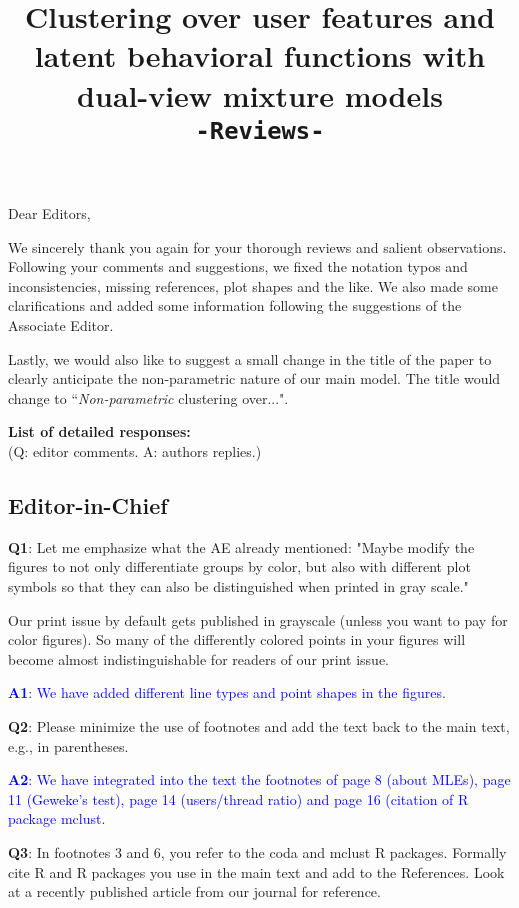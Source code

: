 \documentclass[]{article}
\title{Clustering over user features and latent behavioral functions with dual-view mixture models \\ \texttt{-Reviews-}}
\author{}
\begin{document}
	\date{}
	\maketitle
	
	Dear Editors,
	
	We sincerely thank you again for your thorough reviews and salient observations. Following your comments and suggestions, we fixed the notation typos and inconsistencies, missing references, plot shapes and the like. We also made some clarifications and added some information following the suggestions of the Associate Editor.
	
	Lastly, we would also like to suggest a small change in the title of the paper to clearly anticipate the non-parametric nature of our main model. The title would change to ``\textit{Non-parametric} clustering over...".   
	
	\bigskip
	\noindent
	\textbf{List of detailed responses:}\\
	(Q: editor comments.
	A: authors replies.)
	\subsection*{Editor-in-Chief}
	
	\vspace{3mm}	
	 \textbf{Q1}: Let me emphasize what the AE already mentioned: "Maybe modify the figures to not only differentiate groups by color, but also with different plot symbols so that they can also be distinguished when printed in gray scale."

Our print issue by default gets published in grayscale (unless you want to pay for color figures). So many of the differently colored points in your figures will become almost indistinguishable for readers of our print issue.
		
		\textcolor{blue}{  \textbf{A1}: We have added different line types and point shapes in the figures.} 
	\vspace{3mm}	

	\textbf{Q2}: Please minimize the use of footnotes and add the text back to the main text, e.g., in parentheses.
		
		\textcolor{blue}{  \textbf{A2}: We have integrated into the text the footnotes of page 8 (about  MLEs), page 11 (Geweke's test), page 14 (users/thread ratio) and page 16 (citation of R package mclust}.

	\vspace{3mm}	
		
\textbf{Q3}:  In footnotes 3 and 6, you refer to the coda and mclust R packages. Formally cite R and R packages you use in the main text and add to the References. Look at a recently published article from our journal for reference.
		
\end{document}
